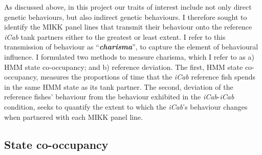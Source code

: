 \documentclass[
]{book}
\begin{document}
As discussed above, in this project our traits of interest include not only direct genetic behaviours, but also indirect genetic behaviours. I therefore sought to identify the MIKK panel lines that transmit their behaviour onto the reference \emph{\textcolor{iCab_424B4D}{iCab}} tank partners either to the greatest or least extent. I refer to this transmission of behaviour as ``\textbf{\emph{charisma}}'', to capture the element of behavioural influence. I formulated two methods to measure charisma, which I refer to as a) HMM state co-occupancy; and b) reference deviation. The first, HMM state co-occupancy, measures the proportions of time that the \emph{\textcolor{iCab_424B4D}{iCab}} reference fish spends in the same HMM state as its tank partner. The second, deviation of the reference fishes' behaviour from the behaviour exhibited in the \emph{\textcolor{iCab_424B4D}{iCab}}-\emph{\textcolor{iCab_424B4D}{iCab}} condition, seeks to quantify the extent to which the \emph{\textcolor{iCab_424B4D}{iCab}}'s behaviour changes when partnered with each MIKK panel line.

\hypertarget{state-co-occupancy}{%
\subsection{State co-occupancy}\label{state-co-occupancy}}
\end{document}
